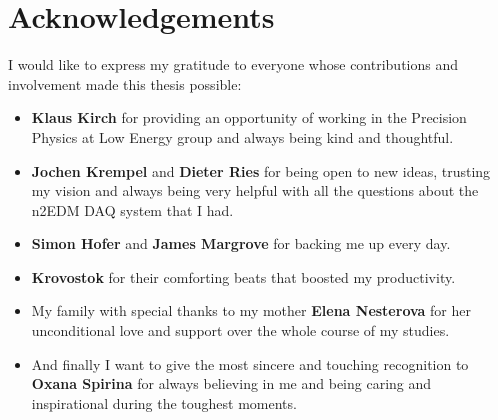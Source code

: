 \chapter{Acknowledgements}

I would like to express my gratitude to everyone whose contributions and involvement made this thesis possible:

\begin{itemize}
	\item \textbf{Klaus Kirch} for providing an opportunity of working in the Precision Physics at Low Energy group and always being kind and thoughtful.
	\item \textbf{Jochen Krempel} and \textbf{Dieter Ries} for being open to new ideas, trusting my vision and always being very helpful with all the questions about the n2EDM DAQ system that I had.
	\item \textbf{Simon Hofer} and \textbf{James Margrove} for backing me up every day.
	\item \textbf{Krovostok} for their comforting beats that boosted my productivity.
	\item My family with special thanks to my mother \textbf{Elena Nesterova} for her unconditional love and support over the whole course of my studies.
	\item And finally I want to give the most sincere and touching recognition to \textbf{Oxana Spirina} for always believing in me and being caring and inspirational during the toughest moments.
\end{itemize}
